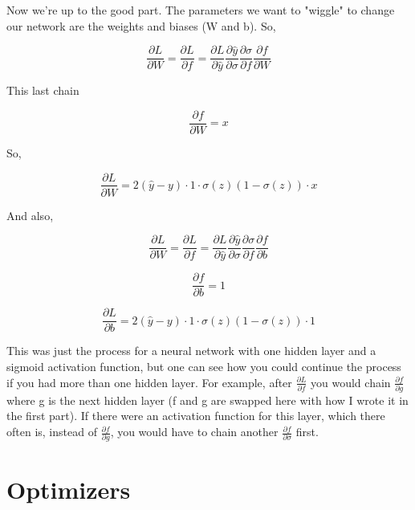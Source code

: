 Now we're up to the good part. The parameters we want to "wiggle" to change our network are the weights and biases (W and b). So,

\begin{equation}
\frac{\partial L}{\partial W} = \frac{\partial L}{\partial f} = \frac{\partial L}{\partial \hat{y}} \frac{\partial \hat{y}}{\partial \sigma} \frac{\partial \sigma}{\partial f} \frac{\partial f}{\partial W}
\end{equation}

This last chain

\begin{equation}
\frac{\partial f}{\partial W} = x
\end{equation}

So,

\begin{equation}
\frac{\partial L}{\partial W} = 2(\hat{y} - y ) \cdot 1 \cdot  \sigma(z)(1 - \sigma(z)) \cdot x
\end{equation}

And also,

\begin{equation}
\frac{\partial L}{\partial W} = \frac{\partial L}{\partial f} = \frac{\partial L}{\partial \hat{y}} \frac{\partial \hat{y}}{\partial \sigma} \frac{\partial \sigma}{\partial f} \frac{\partial f}{\partial b}
\end{equation}

\begin{equation}
\frac{\partial f}{\partial b} = 1
\end{equation}

\begin{equation}
\frac{\partial L}{\partial b} = 2(\hat{y} - y ) \cdot 1 \cdot  \sigma(z)(1 - \sigma(z)) \cdot 1
\end{equation}

This was just the process for a neural network with one hidden layer and a sigmoid activation function, but one can see how you could continue the process if you had more than one hidden layer. For example, after $\frac{\partial L}{\partial f}$ you would chain $\frac{\partial f}{\partial g}$ where g is the next hidden layer (f and g are swapped here with how I wrote it in the first part). If there were an activation function for this layer, which there often is, instead of $\frac{\partial f}{\partial g}$, you would have to chain another $\frac{\partial f}{\partial \sigma}$ first.


\section{Optimizers}
